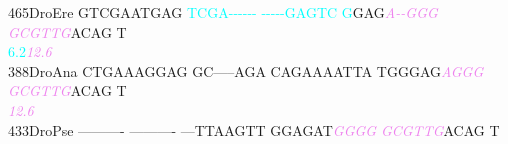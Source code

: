 \documentclass[11pt,twoside,reqno,a4paper]{article}
\begin{document}
{465\hspace*{1\charwidth}DroEre	GTCGAATGAG	\textcolor{cyan}{T}\textcolor{cyan}{C}\textcolor{cyan}{G}\textcolor{cyan}{A}\textcolor{cyan}{-}\textcolor{cyan}{-}\textcolor{cyan}{-}\textcolor{cyan}{-}\textcolor{cyan}{-}\textcolor{cyan}{-}	\textcolor{cyan}{-}\textcolor{cyan}{-}\textcolor{cyan}{-}\textcolor{cyan}{-}\textcolor{cyan}{-}\textcolor{cyan}{G}\textcolor{cyan}{A}\textcolor{cyan}{G}\textcolor{cyan}{T}\textcolor{cyan}{C}	\textcolor{cyan}{G}GAG\textit{\textcolor{violet}{A}}\textit{\textcolor{violet}{-}}\textit{\textcolor{violet}{-}}\textit{\textcolor{violet}{G}}\textit{\textcolor{violet}{G}}\textit{\textcolor{violet}{G}}	\textit{\textcolor{violet}{G}}\textit{\textcolor{violet}{C}}\textit{\textcolor{violet}{G}}\textit{\textcolor{violet}{T}}\textit{\textcolor{violet}{T}}\textit{\textcolor{violet}{G}}ACAG	T\\
\hspace*{4\charwidth}\hspace*{7\charwidth}\hspace*{1\charwidth}\hspace*{10\charwidth}\textcolor{cyan}{6.2}\hspace*{1\charwidth}\hspace*{1\charwidth}\hspace*{21\charwidth}\textit{\textcolor{violet}{12.6}}\hspace*{1\charwidth}\hspace*{1\charwidth}\\
388\hspace*{1\charwidth}DroAna	CTGAAAGGAG	GC-----AGA	CAGAAAATTA	TGGGAG\textit{\textcolor{violet}{A}}\textit{\textcolor{violet}{G}}\textit{\textcolor{violet}{G}}\textit{\textcolor{violet}{G}}	\textit{\textcolor{violet}{G}}\textit{\textcolor{violet}{C}}\textit{\textcolor{violet}{G}}\textit{\textcolor{violet}{T}}\textit{\textcolor{violet}{T}}\textit{\textcolor{violet}{G}}ACAG	T\\
\hspace*{4\charwidth}\hspace*{7\charwidth}\hspace*{1\charwidth}\hspace*{1\charwidth}\hspace*{1\charwidth}\hspace*{36\charwidth}\textit{\textcolor{violet}{12.6}}\hspace*{1\charwidth}\hspace*{1\charwidth}\\
433\hspace*{1\charwidth}DroPse	----------	----------	---TTAAGTT	GGAGAT\textit{\textcolor{violet}{G}}\textit{\textcolor{violet}{G}}\textit{\textcolor{violet}{G}}\textit{\textcolor{violet}{G}}	\textit{\textcolor{violet}{G}}\textit{\textcolor{violet}{C}}\textit{\textcolor{violet}{G}}\textit{\textcolor{violet}{T}}\textit{\textcolor{violet}{T}}\textit{\textcolor{violet}{G}}ACAG	T\\
}
\end{document}

